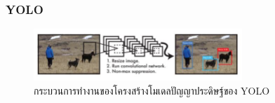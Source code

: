  




\subsubsection*{YOLO}
\begin{figure}[!ht]
    \centering
    \includegraphics[width=0.7\textwidth]{chapter2/images/yolo.jpg}
    \caption{กระบวนการทำงานของโครงสร้างโมเดลปัญญาประดิษฐ์ของ YOLO}
    \label{fig:yolo}
\end{figure}

